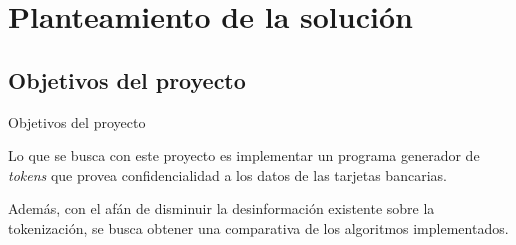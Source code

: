 %
%

\section{Planteamiento de la solución}

\subsection{Objetivos del proyecto} %
\begin{frame}{Objetivos del proyecto}

  Lo que se busca con este proyecto es implementar un programa generador de
  \textit{tokens} que provea confidencialidad a los datos de las tarjetas
  bancarias.

  Además, con el afán de disminuir la desinformación existente sobre la
  tokenización, se busca obtener una comparativa de los algoritmos
  implementados.

\end{frame}

